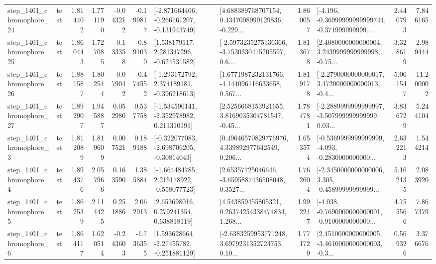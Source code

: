 \begin{tabular}{llrrrrllrlrr}
 step\_1401\_chromophore\_24 &      test &      1.814402 &    1.771190 &     -0.043212 & -0.199817 &  [-2.871664406, -0.266161207, -0.131943749] &  [4.688389768707154, 0.4347008999129836, -0.229... &       1.860057 &  [-4.196, -0.36999999999999744, -0.371999999999... &            2.440793 &          7.846165 \\
 step\_1401\_chromophore\_25 &      test &      1.860443 &    1.727085 &     -0.133358 & -0.891030 &    [1.538179117, 2.281347296, -0.624531582] &  [-2.5973235275136366, -3.7530330415205597, 0.6... &       1.813678 &  [2.4080000000000004, 3.2439999999999998, -0.75... &            3.328619 &          2.989444 \\
 step\_1401\_chromophore\_26 &      test &      1.881587 &    1.802544 &     -0.079042 & -0.474552 &   [-1.293172792, 2.374189181, -0.396218613] &  [1.6771987232131766, -4.144096116633658, 0.567... &       1.819178 &  [-2.2790000000000017, 3.4720000000000013, -0.4... &            5.061547 &         11.200002 \\
 step\_1401\_chromophore\_27 &      test &      1.892907 &    1.945887 &      0.052980 &  0.537758 &   [-1.534590141, -2.352978982, 0.211310191] &  [2.5256668153921655, 3.8169035304781547, -0.45... &       1.784781 &  [-2.2889999999999997, -3.507999999999999, 0.03... &            3.836729 &          5.244104 \\
  step\_1401\_chromophore\_3 &      test &      1.812089 &    1.819609 &      0.007521 &  0.189188 &   [-0.322077083, -2.698706205, -0.30814043] &  [0.49646570829776976, 4.339892977642549, 0.206... &       1.653574 &  [-0.5369999999999999, -4.093, -0.2830000000000... &            2.632213 &          1.544214 \\
  step\_1401\_chromophore\_4 &      test &      1.894376 &    2.057966 &      0.163590 &  1.385884 &   [-1.664484785, 2.215178922, -0.558077723] &  [2.65357725046646, -3.6595887436508048, 0.3527... &       1.762604 &  [-2.3450000000000006, 3.305, -0.45899999999999... &            5.162135 &          2.083920 \\
  step\_1401\_chromophore\_5 &      test &      1.862539 &    2.114425 &      0.251886 &  2.062913 &     [2.653698016, 0.279241354, 0.638818119] &  [4.543859455805321, 0.26374254338474834, 1.268... &       1.992247 &  [-4.038, -0.7690000000000001, -0.9100000000000... &            4.755566 &          7.867379 \\
  step\_1401\_chromophore\_6 &      test &      1.864117 &    1.620514 &     -0.243603 & -1.736355 &    [1.593628664, -2.27455782, -0.251881129] &  [-2.6383259953771248, 3.6979231352724753, 0.10... &       1.771729 &  [2.4510000000000005, -3.4610000000000003, -0.3... &            0.569326 &          3.376676 \\

\end{tabular}
